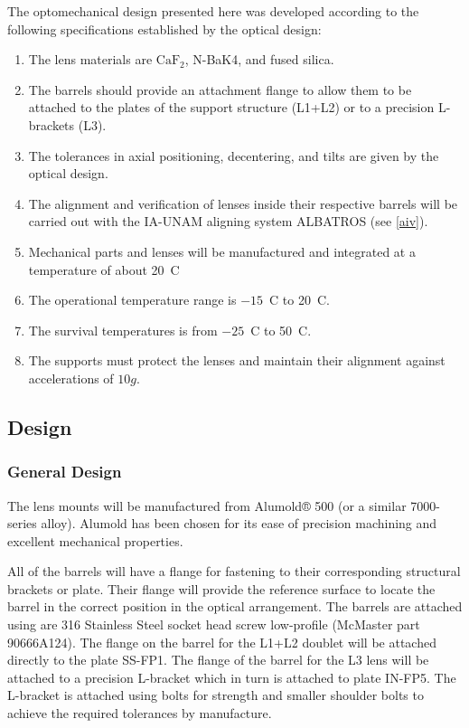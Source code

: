 \documentclass{article}
\newcommand{\CaF}{\ensuremath{\mathrm{CaF_2}}}
\begin{document}
The optomechanical design presented here was developed according to the following specifications established by the optical design:
\begin{enumerate}
\item
The lens materials are {\CaF}, N-BaK4, and fused silica.
\item The barrels should provide an attachment flange to allow them to be attached to the plates of the support structure (L1+L2) or to a precision L-brackets (L3).
\item The tolerances in axial positioning, decentering, and tilts are given by the optical design.
\item The alignment and verification of lenses inside their respective barrels will be carried out with the IA-UNAM aligning system ALBATROS (see \ref{aiv}).
\item Mechanical parts and lenses will be manufactured and integrated at a temperature of about 20~C
\item The operational temperature range is $-15$~C to 20~C.
\item The survival temperatures is from $-25$~C to 50~C.
\item The supports must protect the lenses and maintain their alignment against accelerations of $10g$.
\end{enumerate}

\subsection{Design}

\subsubsection{General Design}

The lens mounts will be manufactured from Alumold® 500 (or a similar 7000-series alloy). Alumold has been chosen for its ease of precision machining and excellent mechanical properties.

All of the barrels will have a flange for fastening to their corresponding structural brackets or plate. Their flange will provide the reference surface to locate the barrel in the correct position in the optical arrangement. The barrels are attached using are 316 Stainless Steel socket head screw low-profile (McMaster part 90666A124). The flange on the barrel for the L1+L2 doublet will be attached directly to the plate SS-FP1. The flange of the barrel for the L3 lens will be attached to a precision L-bracket which in turn is attached to plate IN-FP5. The L-bracket is attached using bolts for strength and smaller shoulder bolts to achieve the required tolerances by manufacture. 
\end{document}
